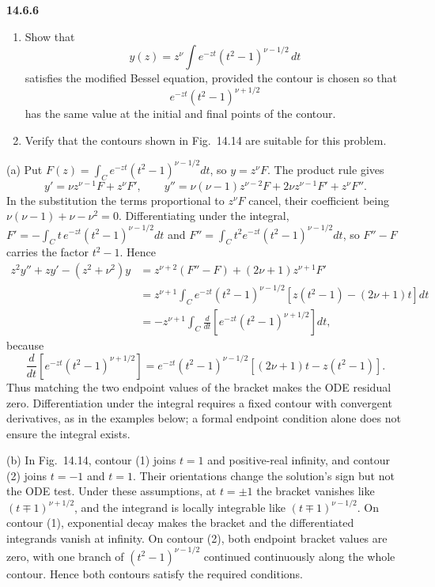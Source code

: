 \par\bigskip
\noindent\textbf{14.6.6}
\begin{enumerate}
\item[(a)] Show that
\[
y(z)=z^{\nu}\int e^{-zt}(t^{2}-1)^{\nu-1/2}\,dt
\]
satisfies the modified Bessel equation, provided the contour is chosen
so that
\[
e^{-zt}(t^{2}-1)^{\nu+1/2}
\]
has the same value at the initial and final points of the contour.
\item[(b)] Verify that the contours shown in Fig.~14.14 are suitable
for this problem.
\end{enumerate}
\par{}
\solution
(a) Put $F(z)=\int_C e^{-zt}(t^2-1)^{\nu-1/2}dt$,
so $y=z^\nu F$. The product rule gives
\[
y'=\nu z^{\nu-1}F+z^\nu F',\qquad
y''=\nu(\nu-1)z^{\nu-2}F+2\nu z^{\nu-1}F'+z^\nu F''.
\]
In the substitution the terms proportional to $z^\nu F$ cancel,
their coefficient being $\nu(\nu-1)+\nu-\nu^2=0$. Differentiating
under the integral,
$F'=-\int_Ct\,e^{-zt}(t^2-1)^{\nu-1/2}dt$ and
$F''=\int_Ct^2e^{-zt}(t^2-1)^{\nu-1/2}dt$, so $F''-F$ carries the
factor $t^2-1$. Hence
\begin{align*}
z^2y''+zy'-(z^2+\nu^2)y
&=z^{\nu+2}(F''-F)+(2\nu+1)z^{\nu+1}F'\\
&=z^{\nu+1}\int_C e^{-zt}(t^2-1)^{\nu-1/2}
[z(t^2-1)-(2\nu+1)t]dt\\
&=-z^{\nu+1}\int_C\frac d{dt}
[e^{-zt}(t^2-1)^{\nu+1/2}]dt,
\end{align*}
because
\[
\frac d{dt}[e^{-zt}(t^2-1)^{\nu+1/2}]
=e^{-zt}(t^2-1)^{\nu-1/2}[(2\nu+1)t-z(t^2-1)].
\]
Thus matching the two endpoint values of the bracket makes the
ODE residual zero. Differentiation under the integral requires a
fixed contour with convergent derivatives, as in the examples
below; a formal endpoint condition alone does not ensure the
integral exists.

(b) In Fig.~14.14, contour (1) joins $t=1$ and positive-real
infinity, and contour (2) joins $t=-1$ and $t=1$. Their
orientations change the solution's sign but not the ODE test.
Under these assumptions, at $t=\pm1$ the bracket vanishes like
$(t\mp1)^{\nu+1/2}$, and the integrand is locally integrable
like $(t\mp1)^{\nu-1/2}$. On contour (1), exponential decay
makes the bracket and the differentiated integrands vanish at
infinity. On contour (2), both endpoint bracket values are zero,
with one branch of $(t^2-1)^{\nu-1/2}$ continued continuously
along the whole contour. Hence both contours satisfy the
required conditions.

